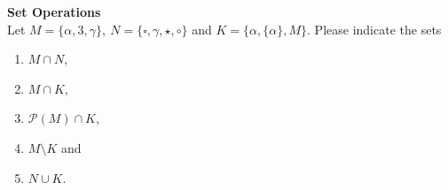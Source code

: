 \textbf{Set Operations}\\
	Let $M = \lbrace \alpha, 3, \gamma\rbrace,~ N = \lbrace \square, \gamma, \star, \circ \rbrace$ and $K = \lbrace \alpha, \lbrace \alpha \rbrace, M \rbrace$. Please indicate the sets \begin{enumerate}
		\item $M \cap N$,
		\item $M \cap K$,
		\item $\mathcal{P}(M) \cap K$,
		\item $M \setminus K$ and
		\item $N \cup K$.
	\end{enumerate}